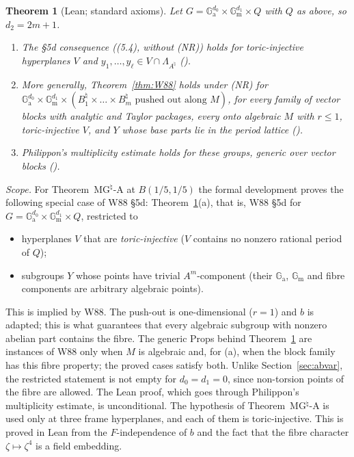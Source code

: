 \documentclass[11pt]{amsart}
\newtheorem{theorem}{Theorem}[section]
\theoremstyle{definition}
\theoremstyle{remark}
\numberwithin{equation}{section}
\newcommand{\Ga}{\mathbb{G}_{\mathrm{a}}}
\newcommand{\Gm}{\mathbb{G}_{\mathrm{m}}}
\newcommand{\NR}{\textup{(NR)}}
\begin{document}
\begin{theorem}[Lean; standard axioms]\label{thm:abvarv}
Let $G=\Ga^{d_0}\times\Gm^{d_1}\times Q$ with $Q$ as above, so $d_2=2m+1$.
\begin{enumerate}
\item[(a)] The \S5d consequence ((5.4), without \NR) holds for toric-injective hyperplanes $V$ and
$y_1,\dots,y_\ell\in V\cap\Lambda_{A^\natural}$ ().
\item[(b)] More generally, Theorem~\ref{thm:W88} holds under \NR{} for $\Ga^{d_0}\times\Gm^{d_1}\times(B_1^\natural\times\dots
\times B_m^\natural\text{ pushed out along }M)$, for every family of vector blocks with analytic and Taylor
packages, every onto algebraic $M$ with $r\le1$, toric-injective $V$, and $Y$ whose base parts lie in the period
lattice ().
\item[(c)] Philippon's multiplicity estimate holds for these groups, generic over vector blocks
().
\end{enumerate}
\end{theorem}

\emph{Scope.} For Theorem~MG$^\natural$-A at $B(1/5,1/5)$ the formal development proves the following special case of
W88 \S5d: Theorem~\ref{thm:abvarv}(a), that is, W88 \S5d for $G=\Ga^{d_0}\times\Gm^{d_1}\times Q$, restricted to
\begin{itemize}
\item hyperplanes $V$ that are \emph{toric-injective} ($V$ contains no nonzero rational period of $Q$);
\item subgroups $Y$ whose points have trivial $A^m$-component (their $\Ga$, $\Gm$ and fibre components are arbitrary
algebraic points).
\end{itemize}
This is implied by W88. The push-out is one-dimensional ($r=1$) and $b$ is adapted; this is what guarantees that
every algebraic subgroup with nonzero abelian part contains the fibre. The generic Props behind
Theorem~\ref{thm:abvarv} are instances of W88 only when $M$ is algebraic and, for (a), when the block family has this
fibre property; the proved cases satisfy both. Unlike Section~\ref{sec:abvar}, the restricted statement is not empty
for $d_0=d_1=0$, since non-torsion points of the fibre are allowed. The Lean proof, which goes through Philippon's
multiplicity estimate, is unconditional. The hypothesis of Theorem~MG$^\natural$-A is used only at three frame
hyperplanes, and each of them is toric-injective. This is proved in Lean from the $F$-independence of $b$ and the
fact that the fibre character $\zeta\mapsto\zeta^4$ is a field embedding.
\end{document}
